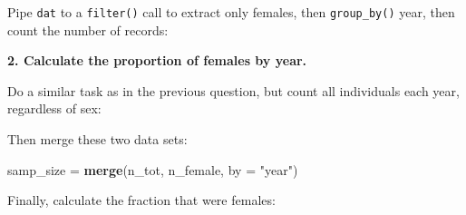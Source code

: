 \documentclass[]{book}
\newenvironment{Shaded}{\begin{snugshade}}{\end{snugshade}}
\newcommand{\KeywordTok}[1]{\textcolor[rgb]{0.13,0.29,0.53}{\textbf{#1}}}
\newcommand{\DataTypeTok}[1]{\textcolor[rgb]{0.13,0.29,0.53}{#1}}
\newcommand{\StringTok}[1]{\textcolor[rgb]{0.31,0.60,0.02}{#1}}
\newcommand{\OperatorTok}[1]{\textcolor[rgb]{0.81,0.36,0.00}{\textbf{#1}}}
\newcommand{\NormalTok}[1]{#1}
\theoremstyle{definition}
\theoremstyle{definition}
\theoremstyle{definition}
\theoremstyle{remark}
\begin{document}
Pipe \texttt{dat} to a \texttt{filter()} call to extract only females,
then \texttt{group\_by()} year, then count the number of records:

\begin{Shaded}
\end{Shaded}

\textbf{2. Calculate the proportion of females by year.}

Do a similar task as in the previous question, but count all individuals
each year, regardless of sex:

\begin{Shaded}
\end{Shaded}

Then merge these two data sets:

\begin{Shaded}
\begin{Highlighting}[]
\NormalTok{samp_size =}\StringTok{ }\KeywordTok{merge}\NormalTok{(n_tot, n_female, }\DataTypeTok{by =} \StringTok{"year"}\NormalTok{)}
\end{Highlighting}
\end{Shaded}

Finally, calculate the fraction that were females:

\begin{Shaded}
\end{Shaded}
\end{document}
